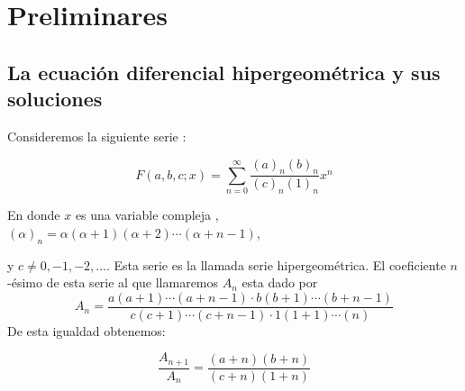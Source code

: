 







\chapter{Preliminares}
\label{cha:Introduction}









\section{La ecuaci\'on diferencial hipergeom\'etrica y sus soluciones  } \label{sec:sol_ec_hip}

Consideremos la siguiente serie :

$$F(a,b,c;x)= \sum_{n=0}^{\infty } \frac{(a)_{n} (b)_{n}}{(c)_{n}(1)_{n}} x^{n}$$

En donde $x$ es una variable compleja , $(\alpha)_{n} = \alpha (\alpha +1)(\alpha +2)\cdots (\alpha +n-1)$, %

y $c \neq 0, -1, -2,...$. Esta serie es la llamada serie hipergeométrica.  El coeficiente $n$-\'esimo de esta serie al que llamaremos $A_{n}$ esta dado por $$A_{n}=\frac{a(a+1)\cdots (a+n-1) \cdot b(b+1)\cdots(b +n -1) }{c(c+1)\cdots (c+n-1) \cdot 1 (1+1) \cdots (n)}$$ De esta igualdad obtenemos:

\begin{equation}
\frac{A_{n+1}}{A_{n}}= \frac{(a+n)(b+n)}{(c+n)(1+n)}
\end{equation}

